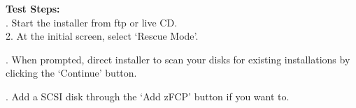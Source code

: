 \documentclass{article}
\begin{document}
\noindent
\textbf{Test Steps:}\\
. Start the installer from ftp or live CD.\\
2. At the initial screen, select `Rescue Mode'.\\
\begin{figure}[H]        
\end{figure}
. When prompted, direct installer to scan your disks for existing
installations by clicking the `Continue' button.\\
\begin{figure}[H]        
\end{figure}
. Add a SCSI disk through the `Add zFCP' button if you want to.\\
\end{document}
